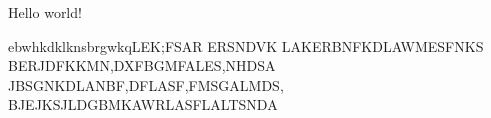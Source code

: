 \documentclass[a4paper, 12pt]{article}
\begin{document}
    Hello world!

    ebwhkdklknsbrgwkqLEK;FSAR
    ERSNDVK LAKERBNFKDLAWMESFNKS
    BERJDFKKMN,DXFBGMFALES,NHDSA
    JBSGNKDLANBF,DFLASF,FMSGALMDS,
    BJEJKSJLDGBMKAWRLASFLALTSNDA
    
\end{document}
